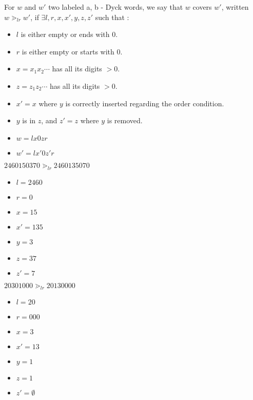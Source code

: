 \begin{definition}[$\gtrdot_{lr}$]
    For $w$ and $w'$ two labeled a, b - Dyck words, we say
    that $w$ covers $w'$, written $w \gtrdot_{lr} w'$,
    if $\exists l, r, x, x', y, z, z'$ such that :
    \begin{itemize}
        \item $l$ is either empty or ends with $0$.
        \item $r$ is either empty or starts with $0$.
        \item $x = x_1x_2 \cdots$ has all its digits $> 0$.
        \item $z = z_1z_2 \cdots$ has all its digits $> 0$.
        \item $x' = x$ where $y$ is correctly inserted
            regarding the order condition.
        \item $y$ is in $z$, and $z' = z$ where $y$ is removed.
        \item $w = lx0zr$
        \item $w' = lx'0z'r$
    \end{itemize}  

\end{definition}

\begin{example}[$a > b : a = 7, b = 3$]
    $2460150370 \gtrdot_{lr} 2460135070$
    \begin{itemize}
        \item $l = 2460$
        \item $r = 0$
        \item $x = 15$
        \item $x' = 135$
        \item $y = 3$
        \item $z = 37$
        \item $z' = 7$
    \end{itemize}
\end{example}

\begin{example}[$a < b : a = 3, b = 5$]
    $20301000 \gtrdot_{lr} 20130000 $
    \begin{itemize}
        \item $l = 20$
        \item $r = 000$
        \item $x = 3$
        \item $x' = 13$
        \item $y = 1$
        \item $z = 1$
        \item $z' = \emptyset$
    \end{itemize}
\end{example}


